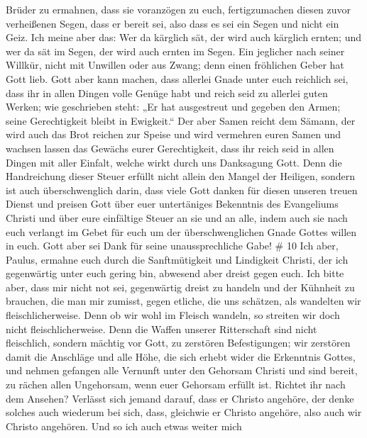 Brüder zu ermahnen, dass sie voranzögen zu euch, fertigzumachen diesen
zuvor verheißenen Segen, dass er bereit sei, also dass es sei ein Segen
und nicht ein Geiz.  Ich meine aber das: Wer da kärglich
sät, der wird auch kärglich ernten; und wer da sät im Segen, der wird
auch ernten im Segen.  Ein jeglicher nach seiner Willkür,
nicht mit Unwillen oder aus Zwang; denn einen fröhlichen Geber hat Gott
lieb.  Gott aber kann machen, dass allerlei Gnade unter euch
reichlich sei, dass ihr in allen Dingen volle Genüge habt und reich seid
zu allerlei guten Werken;  wie geschrieben steht: „Er hat
ausgestreut und gegeben den Armen; seine Gerechtigkeit bleibt in
Ewigkeit.``  Der aber Samen reicht dem Sämann, der wird
auch das Brot reichen zur Speise und wird vermehren euren Samen und
wachsen lassen das Gewächs eurer Gerechtigkeit,  dass ihr
reich seid in allen Dingen mit aller Einfalt, welche wirkt durch uns
Danksagung Gott.  Denn die Handreichung dieser Steuer
erfüllt nicht allein den Mangel der Heiligen, sondern ist auch
überschwenglich darin, dass viele Gott danken für diesen unseren treuen
Dienst  und preisen Gott über euer untertäniges Bekenntnis
des Evangeliums Christi und über eure einfältige Steuer an sie und an
alle,  indem auch sie nach euch verlangt im Gebet für euch
um der überschwenglichen Gnade Gottes willen in euch.  Gott
aber sei Dank für seine unaussprechliche Gabe! \# 10  Ich
aber, Paulus, ermahne euch durch die Sanftmütigkeit und Lindigkeit
Christi, der ich gegenwärtig unter euch gering bin, abwesend aber dreist
gegen euch.  Ich bitte aber, dass mir nicht not sei,
gegenwärtig dreist zu handeln und der Kühnheit zu brauchen, die man mir
zumisst, gegen etliche, die uns schätzen, als wandelten wir
fleischlicherweise.  Denn ob wir wohl im Fleisch wandeln, so
streiten wir doch nicht fleischlicherweise.  Denn die Waffen
unserer Ritterschaft sind nicht fleischlich, sondern mächtig vor Gott,
zu zerstören Befestigungen;  wir zerstören damit die
Anschläge und alle Höhe, die sich erhebt wider die Erkenntnis Gottes,
und nehmen gefangen alle Vernunft unter den Gehorsam Christi
 und sind bereit, zu rächen allen Ungehorsam, wenn euer
Gehorsam erfüllt ist.  Richtet ihr nach dem Ansehen?
Verlässt sich jemand darauf, dass er Christo angehöre, der denke solches
auch wiederum bei sich, dass, gleichwie er Christo angehöre, also auch
wir Christo angehören.  Und so ich auch etwas weiter mich
